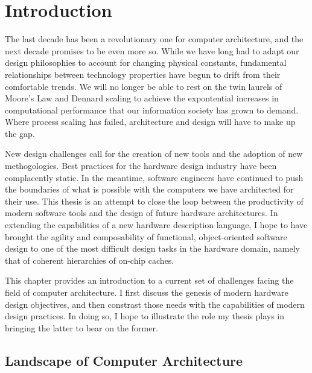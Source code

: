 \chapter{Introduction}
\label{c.intro}

The last decade has been a revolutionary one for computer architecture, and the next decade promises to be even more so.
While we have long had to adapt our design philosophies to account for changing physical constants,
fundamental relationships between technology properties have begun to drift from their comfortable trends.
We will no longer be able to rest on the twin laurels of Moore's Law and Dennard scaling to achieve the
expontential increases in computational performance that our information society has grown to demand.
Where process scaling has failed, architecture and design will have to make up the gap.

New design challenges call for the creation of new tools and the adoption of new methogologies.
Best practices for the hardware design industry have been complacently static.
In the meantime, software engineers have continued to push the boundaries of what is possible with the computers we have architected for their use.
This thesis is an attempt to close the loop between the productivity of modern software tools and the design of future hardware architectures.
In extending the capabilities of a new hardware description language, I hope to have brought the agility and composability of functional, object-oriented software design to one of the most difficult design tasks in the hardware domain,
namely that of coherent hierarchies of on-chip caches.

This chapter provides an introduction to a current set of challenges facing the field of computer architecture.
I first discuss the genesis of modern hardware design objectives,
and then constrast those needs with the capabilities of modern design practices.
In doing so, I hope to illustrate the role my thesis plays in bringing the latter to bear on the former. 

\section{Landscape of Computer Architecture}

